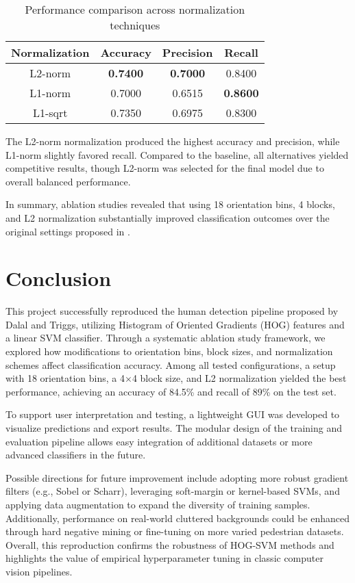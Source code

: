 \documentclass[10pt, onecolumn, a4paper]{article}
\begin{document}
\begin{table}[H]
\centering
\caption{\small Performance comparison across normalization techniques}
\begin{tabular}{|c|c|c|c|}
\hline
\textbf{Normalization} & \textbf{Accuracy} & \textbf{Precision} & \textbf{Recall} \\
\hline
L2-norm & \textbf{0.7400} & \textbf{0.7000} & 0.8400 \\
L1-norm & 0.7000 & 0.6515 & \textbf{0.8600} \\
L1-sqrt & 0.7350 & 0.6975 & 0.8300 \\
\hline
\end{tabular}
\label{tab:norm_ablation}
\end{table}

The L2-norm normalization produced the highest accuracy and precision, while L1-norm slightly favored recall. Compared to the baseline, 
all alternatives yielded competitive results, though L2-norm was selected for the final model due to overall balanced performance.

\vspace{0.5em}
In summary, ablation studies revealed that using 18 orientation bins, 4 blocks, 
and L2 normalization substantially improved classification outcomes over the original settings proposed in \cite{1467360}.

\vspace{0.5em}
\section{Conclusion}
\vspace{0.5em}

This project successfully reproduced the human detection pipeline proposed by Dalal and Triggs, utilizing Histogram of Oriented Gradients (HOG) features and a linear SVM classifier. 
Through a systematic ablation study framework, we explored how modifications to orientation bins, block sizes, and normalization schemes affect classification accuracy. 
Among all tested configurations, a setup with 18 orientation bins, a 4$\times$4 block size, and L2 normalization yielded the best performance, achieving an accuracy of 84.5\% and recall of 89\% on the test set.

To support user interpretation and testing, a lightweight GUI was developed to visualize predictions and export results. 
The modular design of the training and evaluation pipeline allows easy integration of additional datasets or more advanced classifiers in the future.

Possible directions for future improvement include adopting more robust gradient filters (e.g., Sobel or Scharr), leveraging soft-margin or kernel-based SVMs, 
and applying data augmentation to expand the diversity of training samples. 
Additionally, performance on real-world cluttered backgrounds could be enhanced through hard negative mining or fine-tuning on more varied pedestrian datasets. 
Overall, this reproduction confirms the robustness of HOG-SVM methods and highlights the value of empirical hyperparameter tuning in classic computer vision pipelines.

\newpage


\end{document}
